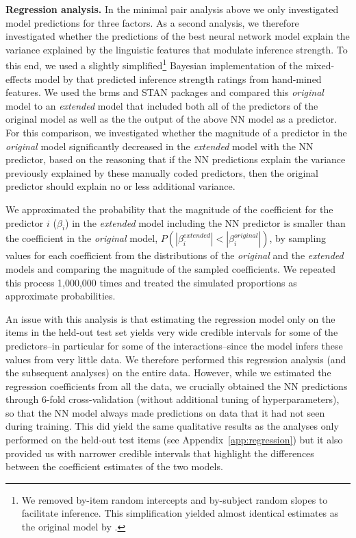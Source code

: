 \documentclass[11pt,a4paper]{article}
\begin{document}
\textbf{Regression analysis.} In the minimal pair analysis above we only investigated model predictions for three factors. As a second analysis, we therefore investigated whether the predictions of the best neural network model explain the variance explained by the linguistic features that modulate inference strength. To this end, we used a slightly simplified\footnote{We removed by-item random intercepts  and by-subject random slopes to facilitate inference. This simplification yielded almost identical estimates as the original model by .} Bayesian implementation of the mixed-effects model by  that predicted inference strength ratings from hand-mined features. We used the brms \cite{burkner2017brms} and STAN \cite{carpenter2017stan} packages and compared this \textit{original} model to an \textit{extended} model that included both all of the predictors of the original model as well as the the output of the above NN model as a predictor. For this comparison, we investigated whether the magnitude of a predictor in the \textit{original} model significantly decreased in the \textit{extended} model with the NN predictor, based on the reasoning that if the NN predictions explain the variance previously explained by these manually coded predictors, then the original predictor should explain no or less additional variance. 

We approximated the probability that the magnitude of the coefficient for the predictor $i$ ($\beta_i$) in the \textit{extended} model including the NN predictor is smaller than the coefficient in the \textit{original} model, $P(|\beta_i^{extended}| < |\beta_i^{original}|)$, by sampling values for each coefficient from the distributions of the \textit{original} and the \textit{extended} models and comparing the magnitude of the sampled coefficients. We repeated this process 1,000,000 times and treated the simulated proportions as approximate probabilities.


An issue with this analysis is that  estimating the regression model only on the items in the held-out test set yields very wide credible intervals for some of the predictors--in particular for some of the interactions--since the model infers these values from very little data. We therefore performed this regression analysis (and the subsequent analyses) on the entire data. However, while we estimated the regression coefficients from all the data, we crucially obtained the NN predictions through 6-fold cross-validation (without additional tuning of hyperparameters), so that the NN model always made predictions on data that it had not seen during training. This did yield the same qualitative results as the analyses only performed on the held-out test items (see Appendix~\ref{app:regression}) but it also provided us with narrower credible intervals that highlight the differences between the coefficient estimates of the two models.
\end{document}
